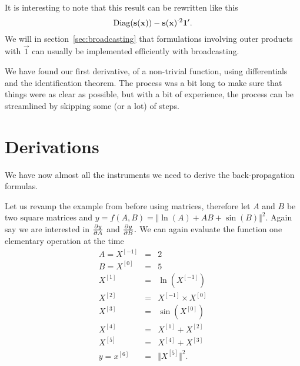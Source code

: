 \documentclass{sapthesis}
\begin{document}
It is interesting to note that this result can be rewritten like this
\[\mathrm{Diag}(\mathbf{s}(\mathbf{x})) - \mathbf{s}(\mathbf{x})^{{\cdot}2} \mathbf{1}'.\] We will in
section~\ref{sec:broadcasting} that formulations involving outer products with
\(\vec 1\) can usually be implemented efficiently with broadcasting.

We have found our first derivative, of a non-trivial function, using
differentials and the identification theorem. The process was a bit long to make
sure that things were as clear as possible, but with a bit of experience, the
process can be streamlined by skipping some (or a lot) of steps.

\section{Derivations}\label{sec:derivations}

We have now almost all the instruments we need to derive the back-propagation
formulas.

Let us revamp the example from before using matrices, therefore let \(A\) and
\(B\) be two square matrices and \(y = f(A,B) = \Vert\ln(A) + A B +
\sin(B)\Vert^2.\) Again say we are interested in \(\textstyle\frac{\partial y}{\partial A}\) and
\(\textstyle\frac{\partial y}{\partial B}.\) We can again evaluate the function one elementary
operation at the time
\begin{eqnarray*}
A = X^{[-1]} &=& 2 \\
B = X^{[0]}  &=& 5 \\
    X^{[1]}  &=& \ln\left(X^{[-1]}\right) \\
    X^{[2]}  &=& X^{[-1]} \times X^{[0]} \\
    X^{[3]}  &=& \sin\left(X^{[0]}\right) \\
    X^{[4]}  &=& X^{[1]} + X^{[2]} \\
    X^{[5]}  &=& X^{[4]} + X^{[3]} \\
y = x^{[6]}  &=& \Vert X^{[5]}\Vert^2.
\end{eqnarray*}
\end{document}
